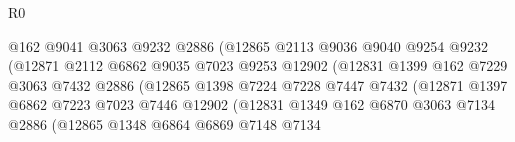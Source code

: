 \begin{lexlean}{R0}
\begin{coremodule}
                                      @162
                                      @9041
                                      @3063
                                      @9232
                                      @2886
                                      (@12865
                                        @2113
                                        @9036
                                        @9040
                                        @9254
                                        @9232
                                        (@12871
                                          @2112
                                          @6862
                                          @9035
                                          @7023
                                          @9253
                                          @12902
                                          (@12831
                                            @1399
                                            @162
                                            @7229
                                            @3063
                                            @7432
                                            @2886
                                            (@12865
                                              @1398
                                              @7224
                                              @7228
                                              @7447
                                              @7432
                                              (@12871
                                                @1397
                                                @6862
                                                @7223
                                                @7023
                                                @7446
                                                @12902
                                                (@12831
                                                  @1349
                                                  @162
                                                  @6870
                                                  @3063
                                                  @7134
                                                  @2886
                                                  (@12865
                                                    @1348
                                                    @6864
                                                    @6869
                                                    @7148
                                                    @7134

\end{coremodule}
\end{lexlean}
